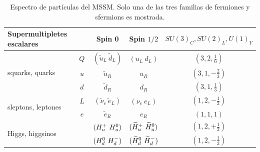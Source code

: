 \begin{table} 

	\centering

	\caption{Espectro de partículas del MSSM. Solo una de las tres familias de fermiones y sfermions es mostrada. 
	}
	\renewcommand{\arraystretch}{1.2}
	\begin{tabular}{ l c | c c c}

	\hline
	\hline

		\multicolumn{2}{l|}{Supermultipletes escalares} & Spin 0 & Spin $1/2$ & $SU(3)_C, SU(2)_L, U(1)_Y$ \\ 

		\hline
		\hline

		\multirow{3}{*}{squarks, quarks} & $Q$ & $(\tilde{u}_L\ \tilde{d}_L)$ & $(u_L\ d_L)$ & $(3, 2, \frac{1}{6})$ \\ [1ex]
		 & $u$ & $\tilde{u}_R$ & $u_R$ & $(3, 1, -\frac{2}{3})$ \\ [1ex]
		 & $d$ & $\tilde{d}_R$ & $d_R$ & $(3, 1, \frac{1}{3})$ \\ [1ex]

		\hline

		\multirow{2}{*}{sleptons, leptones} & $L$ & $(\tilde{\nu}_e\ \tilde{e}_L)$ & $(\nu_e\ e_L)$ & $(1, 2, -\frac{1}{2})$ \\ [1ex]
		 & $e$ & $\tilde{e}_R$ & $e_R$ & $(1, 1, 1)$ \\ [1ex]

		\hline

		\multirow{2}{*}{Higgs, higgsinos} & \Hu & $(\Hup\ \Huzero)$ & $(\Hinoup\ \Hinouzero)$ & $(1, 2, +\frac{1}{2})$ \\ [1ex]
		 & \Hd & $(\Hdzero\ \Hdm)$ & $(\Hinodzero\ \Hinodm)$ & $(1, 2, -\frac{1}{2})$ \\ [1ex]


		\hline
		\hline

	\end{tabular}

	\vspace{0.5cm}


\end{table}
